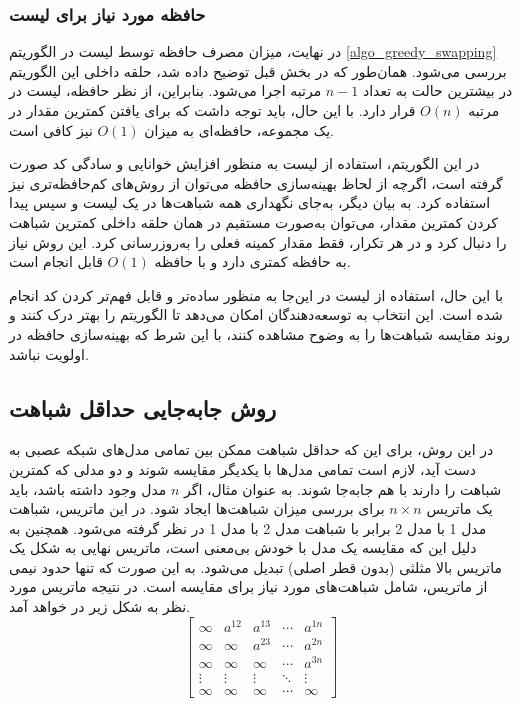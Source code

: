\vspace{3mm}
\subsubsection{
	حافظه مورد نیاز برای لیست
}\vspace{-1mm}
در نهایت، میزان مصرف حافظه توسط لیست
در الگوریتم
 \ref{algo_greedy_swapping} 
بررسی می‌شود. همان‌طور که در بخش قبل توضیح داده شد، حلقه داخلی این الگوریتم در بیشترین حالت به تعداد \(n-1\) مرتبه اجرا می‌شود. بنابراین، از نظر حافظه، لیست
در مرتبه \(O(n)\) قرار دارد. با این حال، باید توجه داشت که برای یافتن کمترین مقدار در یک مجموعه، حافظه‌ای به میزان \(O(1)\) نیز کافی است. 

در این الگوریتم، استفاده از لیست
به منظور افزایش خوانایی و سادگی کد صورت گرفته است، اگرچه از لحاظ بهینه‌سازی حافظه می‌توان از روش‌های کم‌حافظه‌تری نیز استفاده کرد. به بیان دیگر، به‌جای نگهداری همه شباهت‌ها در یک لیست و سپس پیدا کردن کمترین مقدار، می‌توان به‌صورت مستقیم در همان حلقه داخلی کمترین شباهت را دنبال کرد و در هر تکرار، فقط مقدار کمینه فعلی را به‌روزرسانی کرد. این روش نیاز به حافظه کمتری دارد و با حافظه \(O(1)\) قابل انجام است.

با این حال، استفاده از لیست
در این‌جا به منظور ساده‌تر و قابل فهم‌تر کردن کد انجام شده است. این انتخاب به توسعه‌دهندگان امکان می‌دهد تا الگوریتم را بهتر درک کنند و روند مقایسه شباهت‌ها را به وضوح مشاهده کنند، با این شرط که بهینه‌سازی حافظه در اولویت نباشد.




\subsection{
	روش جابه‌جایی حداقل شباهت%
}
در این روش، برای این که حداقل شباهت ممکن بین تمامی مدل‌های شبکه عصبی به دست آید، لازم است تمامی مدل‌ها با یکدیگر مقایسه شوند و دو مدلی که کمترین شباهت را دارند با هم جابه‌جا شوند. به عنوان مثال، اگر \( n \) مدل وجود داشته باشد، باید یک ماتریس \( n \times n \) برای بررسی میزان شباهت‌ها ایجاد شود. در این ماتریس، شباهت مدل 1 با مدل 2 برابر با شباهت مدل 2 با مدل 1 در نظر گرفته می‌شود. همچنین به دلیل این که مقایسه یک مدل با خودش بی‌معنی است، ماتریس نهایی به شکل یک ماتریس بالا مثلثی%
(بدون قطر اصلی) تبدیل می‌شود. به این صورت که تنها حدود نیمی از ماتریس، شامل شباهت‌های مورد نیاز برای مقایسه است. در نتیجه ماتریس مورد نظر به شکل زیر در خواهد آمد.
\begin{equation}
	\begin{bmatrix}
		\infty & a^{12} & a^{13} & \cdots & a^{1n} \\
		\infty & \infty & a^{23} & \cdots & a^{2n} \\
		\infty & \infty & \infty & \cdots & a^{3n} \\
		\vdots & \vdots & \vdots & \ddots & \vdots \\
		\infty & \infty & \infty & \cdots & \infty
	\end{bmatrix}
	\label{eq_similarity_matrix}
\end{equation}

